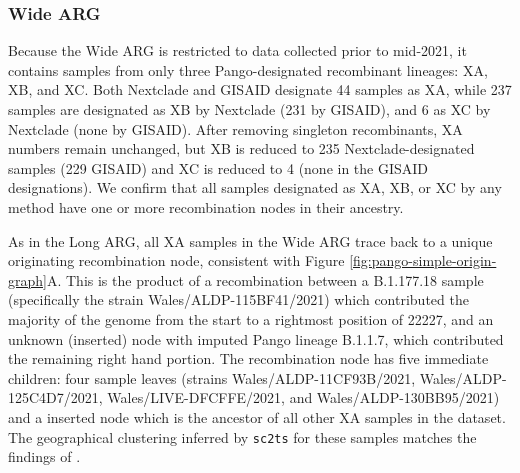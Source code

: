 \documentclass{article}
\begin{document}
\subsubsection{Wide ARG}
\label{sec-pango_x_wide_arg}
Because the Wide ARG is restricted to data collected prior
to mid-2021, it contains samples from only three Pango-designated recombinant
lineages: XA, XB, and XC. Both Nextclade and GISAID designate 44
samples as XA, while 237 samples are designated
as XB by Nextclade (231 by GISAID), and 6 as XC by Nextclade (none by GISAID).
After removing singleton recombinants, XA numbers remain unchanged, but XB is
reduced to 235 Nextclade-designated samples (229 GISAID) and XC is reduced to 4
(none in the GISAID designations). We confirm that all samples
designated as XA, XB, or XC by any method have one or more recombination nodes
in their ancestry.

As in the Long ARG, all XA samples in the Wide ARG trace back to a
unique originating recombination node, consistent with Figure \ref{fig:pango-simple-origin-graph}A.
This is the product of a recombination
between a B.1.177.18 sample (specifically the strain Wales/ALDP-115BF41/2021)
which contributed the majority of the genome from the start
to a rightmost position of 22227, and an unknown (inserted) node with imputed
Pango lineage B.1.1.7, which contributed the remaining right hand portion. The
recombination node has five immediate children: four sample leaves (strains
Wales/ALDP-11CF93B/2021, Wales/ALDP-125C4D7/2021, Wales/LIVE-DFCFFE/2021, and
Wales/ALDP-130BB95/2021) and a inserted node which is the
ancestor of all other XA samples in the dataset. The geographical clustering inferred by \texttt{sc2ts}
for these samples matches the findings of \citet{Jackson2021-ik}.
\end{document}
